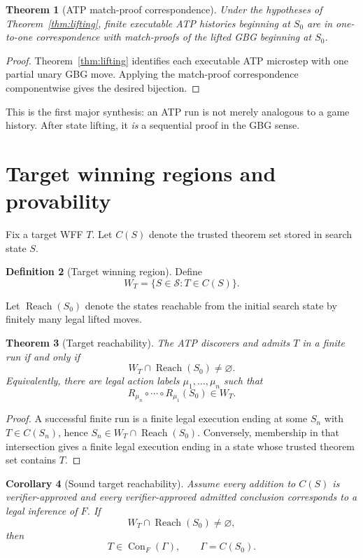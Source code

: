 \documentclass[11pt]{article}
\newtheorem{theorem}{Theorem}[section]
\newtheorem{corollary}[theorem]{Corollary}
\theoremstyle{definition}
\newtheorem{definition}[theorem]{Definition}
\newcommand{\Con}{\operatorname{Con}}
\newcommand{\Reach}{\operatorname{Reach}}
\begin{document}
\begin{theorem}[ATP match-proof correspondence]\label{thm:atp-match}
Under the hypotheses of Theorem~\ref{thm:lifting}, finite executable ATP histories beginning at $S_0$ are in one-to-one correspondence with match-proofs of the lifted GBG beginning at $S_0$.
\end{theorem}

\begin{proof}
Theorem~\ref{thm:lifting} identifies each executable ATP microstep with one partial unary GBG move. Applying the match-proof correspondence componentwise gives the desired bijection.
\end{proof}

This is the first major synthesis: an ATP run is not merely analogous to a game history. After state lifting, it \emph{is} a sequential proof in the GBG sense.

\section{Target winning regions and provability}

Fix a target WFF $T$. Let $C(S)$ denote the trusted theorem set stored in search state $S$.

\begin{definition}[Target winning region]
Define
\[
W_T=\{S\in\mathcal S:T\in C(S)\}.
\]
\end{definition}

Let $\Reach(S_0)$ denote the states reachable from the initial search state by finitely many legal lifted moves.

\begin{theorem}[Target reachability]\label{thm:target-reach}
The ATP discovers and admits $T$ in a finite run if and only if
\[
W_T\cap\Reach(S_0)\neq\varnothing.
\]
Equivalently, there are legal action labels $\mu_1,\ldots,\mu_n$ such that
\[
R_{\mu_n}\circ\cdots\circ R_{\mu_1}(S_0)\in W_T.
\]
\end{theorem}

\begin{proof}
A successful finite run is a finite legal execution ending at some $S_n$ with $T\in C(S_n)$, hence $S_n\in W_T\cap\Reach(S_0)$. Conversely, membership in that intersection gives a finite legal execution ending in a state whose trusted theorem set contains $T$.
\end{proof}

\begin{corollary}[Sound target reachability]\label{cor:sound-reach}
Assume every addition to $C(S)$ is verifier-approved and every verifier-approved admitted conclusion corresponds to a legal inference of $F$. If
\[
W_T\cap\Reach(S_0)\neq\varnothing,
\]
then
\[
T\in\Con_F(\Gamma),
\qquad \Gamma=C(S_0).
\]
\end{corollary}
\end{document}
